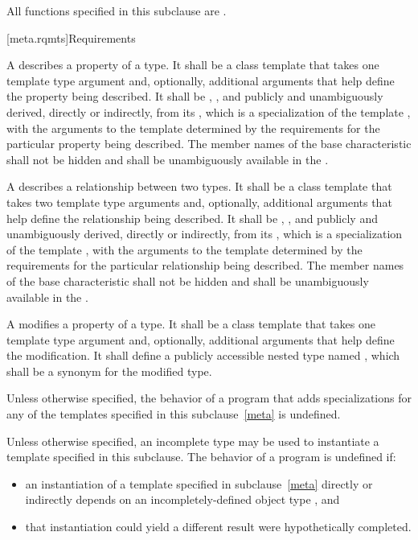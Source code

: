 \pnum
{}%
All functions specified in this subclause are .

[meta.rqmts]{Requirements}

\pnum
A  describes a property
of a type. It shall be a class template that takes one template type
argument and, optionally, additional arguments that help define the
property being described. It shall be ,
,
and publicly and unambiguously derived, directly or indirectly, from
its , which is
a specialization of the template
, with
the arguments to the template  determined by the
requirements for the particular property being described.
The member names of the base characteristic shall not be hidden and shall be
unambiguously available in the .

\pnum
A  describes a
relationship between two types. It shall be a class template that
takes two template type arguments and, optionally, additional
arguments that help define the relationship being described. It shall
be , ,
and publicly and unambiguously derived, directly or
indirectly, from
its , which is a specialization
of the template
, with
the arguments to the template  determined by the
requirements for the particular relationship being described.
The member names of the base characteristic shall not be hidden and shall be
unambiguously available in the .

\pnum
A 
modifies a property
of a type. It shall be a class template that takes one
template type argument and, optionally, additional arguments that help
define the modification. It shall define a publicly accessible nested type
named , which shall be a synonym for the modified type.

\pnum
Unless otherwise specified,
the behavior of a program that adds specializations
for any of the templates specified in this subclause~\ref{meta}
is undefined.

\pnum
Unless otherwise specified, an incomplete type may be used
to instantiate a template specified in this subclause.
The behavior of a program is undefined if:
\begin{itemize}
\item
  an instantiation of a template specified in subclause~\ref{meta}
  directly or indirectly depends on
  an incompletely-defined object type , and
\item
  that instantiation could yield a different result
  were  hypothetically completed.
\end{itemize}

